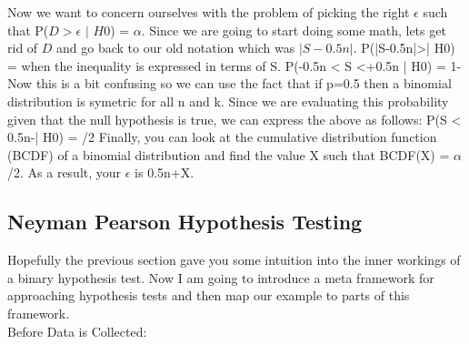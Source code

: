 Now we want to concern ourselves with the problem of picking the right $\epsilon$ such that P(\(D\)$>$$\epsilon$ $|$ \(H0\)) = $\alpha$.
Since we are going to start doing some math, lets get rid of \(D\) and go back to our old notation which was \(|S-0.5n|\).
\beq
\label{eq:confidence_intervals}
P(|S-0.5n|>\epsilon | H0) = \alpha
\eeq
when the inequality is expressed in terms of S. 
\beq
\label{eq:confidence_intervals2}
P(\epsilon-0.5n < S <\epsilon+0.5n | H0) = 1-\alpha
\eeq
Now this is a bit confusing so we can use the fact that if p=0.5 then a binomial distribution is symetric for all n and k. 
Since we are evaluating this probability given that the null hypothesis is true, we can express the above as follows:
\beq
\label{eq:confidence_intervals3}
P(S < 0.5n-\epsilon | H0) = \alpha/2
\eeq
Finally, you can look at the cumulative distribution function (BCDF) of a binomial distribution and find 
the value X such that BCDF(X) = $\alpha$/2. As a result, your $\epsilon$ is 0.5n+X.

\subsection{Neyman Pearson Hypothesis Testing}

Hopefully the previous section gave you some intuition into the inner workings of a binary 
hypothesis test. Now I am going to introduce a meta framework for approaching hypothesis 
tests and then map our example to parts of this framework.\\

Before Data is Collected:

